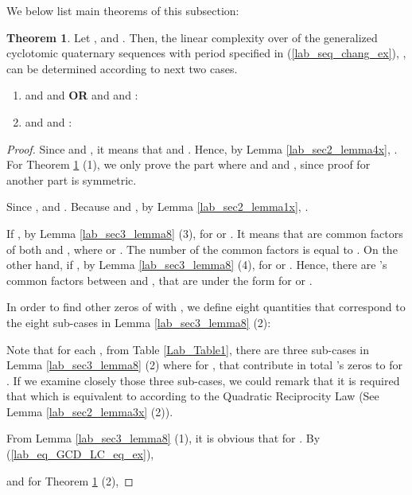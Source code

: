 \documentclass{mcom-l}
\theoremstyle{definition}
\newtheorem{sec3thm1}{Theorem}[section]
\numberwithin{equation}{section}
\begin{document}
     We below list  main theorems of this subsection:
     \begin{sec3thm1}\label{lab_MainThorem_01}
     Let ,  and . Then, the linear complexity over  of the generalized cyclotomic quaternary sequences with period  specified in (\ref{lab_seq_chang_ex}), , can be determined according to next two cases.
     \begin{enumerate}
     \item  and  and  \textbf{OR}  and  and :
     
     \item  and  and :
     
     \end{enumerate}
     \end{sec3thm1}
     \begin{proof}
       Since  and , it means that  and . Hence, by Lemma \ref{lab_sec2_lemma4x}, . For Theorem \ref{lab_MainThorem_01} (1), we only prove the part where  and  and , since proof for another part is symmetric.


       Since ,  and . Because  and , by Lemma \ref{lab_sec2_lemma1x}, .
       
       
       If , by Lemma \ref{lab_sec3_lemma8} (3),  for  or . It means that  are  common factors of both  and , where  or . The number of the common factors is equal to . On the other hand, if , by Lemma \ref{lab_sec3_lemma8} (4),  for  or . Hence, there are 's common factors between   and , that are under the form  for  or .
       
       In order to find other zeros of  with , we define eight quantities that correspond to the eight sub-cases in Lemma \ref{lab_sec3_lemma8} (2):
       
       Note that for each , from Table \ref{Lab_Table1}, there are three sub-cases in Lemma \ref{lab_sec3_lemma8} (2) where   for , that contribute in total 's zeros to  for . If we examine closely those three sub-cases, we could remark that it is required that  which is equivalent to  according to the Quadratic Reciprocity Law (See Lemma \ref{lab_sec2_lemma3x} (2)).  
       
       From Lemma \ref{lab_sec3_lemma8} (1), it is obvious that  for . By (\ref{lab_eq_GCD_LC_eq_ex}), 
       
       and for Theorem \ref{lab_MainThorem_01} (2),
       
\end{proof}
\end{document}
